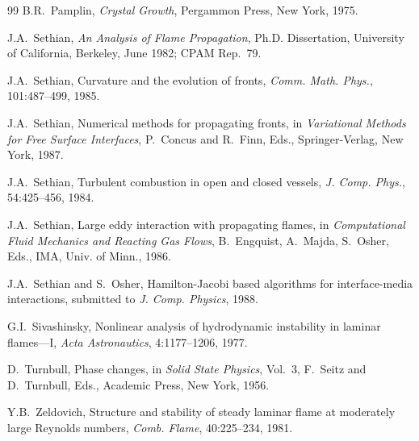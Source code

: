 \documentclass[11pt,a4paper]{article}
\begin{document}
\begin{thebibliography}{99}
B.R.~Pamplin,
\emph{Crystal Growth},
Pergammon Press, New York, 1975.

J.A.~Sethian,
\emph{An Analysis of Flame Propagation},
Ph.D. Dissertation, University of California, Berkeley, June 1982; CPAM Rep.~79.

J.A.~Sethian,
Curvature and the evolution of fronts,
\emph{Comm. Math. Phys.}, 101:487--499, 1985.

J.A.~Sethian,
Numerical methods for propagating fronts,
in \emph{Variational Methods for Free Surface Interfaces},
P.~Concus and R.~Finn, Eds., Springer-Verlag, New York, 1987.

J.A.~Sethian,
Turbulent combustion in open and closed vessels,
\emph{J. Comp. Phys.}, 54:425--456, 1984.

J.A.~Sethian,
Large eddy interaction with propagating flames,
in \emph{Computational Fluid Mechanics and Reacting Gas Flows},
B.~Engquist, A.~Majda, S.~Osher, Eds., IMA, Univ. of Minn., 1986.

J.A.~Sethian and S.~Osher,
Hamilton-Jacobi based algorithms for interface-media interactions,
submitted to \emph{J. Comp. Physics}, 1988.

G.I.~Sivashinsky,
Nonlinear analysis of hydrodynamic instability in laminar flames---I,
\emph{Acta Astronautics}, 4:1177--1206, 1977.

D.~Turnbull,
Phase changes,
in \emph{Solid State Physics}, Vol.~3, F.~Seitz and D.~Turnbull, Eds.,
Academic Press, New York, 1956.

Y.B.~Zeldovich,
Structure and stability of steady laminar flame at moderately large Reynolds numbers,
\emph{Comb. Flame}, 40:225--234, 1981.

\end{thebibliography}
\end{document}
